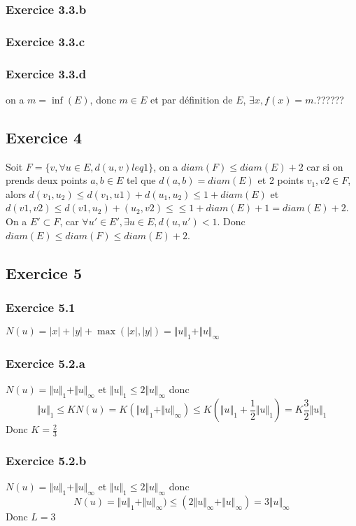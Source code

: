 \documentclass[]{book}
\theoremstyle{definition}
\begin{document}
\subsubsection*{Exercice 3.3.b}


\subsubsection*{Exercice 3.3.c}


\subsubsection*{Exercice 3.3.d}
on a $m=\inf(E)$, donc $m \in E$ et par d\'efinition de $E$, $\exists x, f(x) = m$.??????

\subsection*{Exercice 4}
Soit $F= \{v, \forall u \in E, d(u, v) leq 1\}$, on a $diam(F) \leq diam(E) + 2$ car si on prends deux points $a, b \in E$ tel que $d(a,b) = diam(E)$ et 2 points $v_1, v2 \in F$, alors $d(v_1, u_2) \leq d(v_1, u1)+d(u_1, u_2) \leq 1 + diam(E)$ et $d(v1, v2) \leq d(v1,u_2) + (u_2, v2) \leq  \leq 1 + diam(E) + 1 = diam(E)+2$. 
On a $E' \subset F$, car $\forall u' \in E', \exists u \in E, d(u,u') < 1$. Donc $diam(E) \leq diam(F) \leq diam(E)+2$.


\subsection*{Exercice 5}
\subsubsection*{Exercice 5.1}
$N(u) = |x| + |y| + \max(|x|,|y|) = \Vert u \Vert_1 + \Vert u \Vert_{\infty}$

\subsubsection*{Exercice 5.2.a}
$N(u) = \Vert u \Vert_1 + \Vert u \Vert_{\infty}$ et $\Vert u \Vert_{1} \leq 2 \Vert u \Vert_{\infty}$ donc 
$$\Vert u \Vert_1 \leq K N(u) = K(\Vert u \Vert_1 + \Vert u \Vert_{\infty}) \leq K(\Vert u \Vert_1 + \frac{1}{2} \Vert u \Vert_{1}) = K\frac{3}{2} \Vert u \Vert_{1}$$  
Donc $K=\frac{2}{3}$

\subsubsection*{Exercice 5.2.b}
$N(u) = \Vert u \Vert_1 + \Vert u \Vert_{\infty}$ et $\Vert u \Vert_{1} \leq 2 \Vert u \Vert_{\infty}$ donc 
$$N(u) = \Vert u \Vert_1 + \Vert u \Vert_{\infty}) \leq (2\Vert u \Vert_{\infty} + \Vert u \Vert_{\infty}) = 3 \Vert u \Vert_{\infty}$$  
Donc $L=3$
\end{document}
